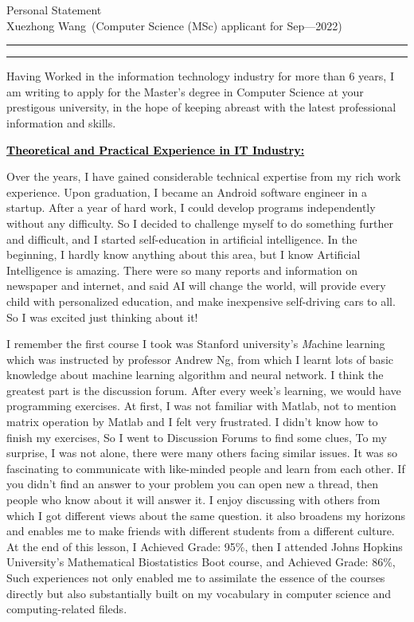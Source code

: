 \documentclass[12pt]{article}
\newcommand{\soptitle}{Personal Statement}
\newcommand{\yourname}{Xuezhong Wang}
\newcommand{\statement}[1]{\par\medskip
  \underline{\textcolor{black}{\textbf{#1:}}}\space
}
\begin{document}
\begin{center}\LARGE\soptitle\\
\large \yourname\ (Computer Science (MSc) applicant for Sep---2022)
\end{center}

\hrule
\vspace{1pt}
\hrule height 1pt


\sffamily
\mdseries



\bigskip

Having Worked in the information technology industry for more than 6 years, I am writing to apply for the Master's degree in Computer Science at your prestigous university, in the hope of keeping abreast with the latest professional information and skills.

\bigskip

\statement{Theoretical and Practical Experience in IT Industry}
Over the years, I have gained considerable technical expertise from my rich work experience. Upon graduation, I became an Android software engineer in a startup. After a year of hard work, I could develop programs independently without any difficulty. So I decided to challenge myself to do something further and difficult, and I started self-education in artificial intelligence. In the beginning, I hardly know anything about this area, but I know Artificial Intelligence is amazing. There were so many reports and information on newspaper and internet, and said AI will change the world, will provide every child with personalized education, and make inexpensive self-driving cars to all. So I was excited just thinking about it! 

\bigskip

I remember the first course I took was Stanford university's \textit{M}achine learning which was instructed by professor Andrew Ng, from which I learnt lots of basic knowledge about machine learning algorithm and neural network. I think the greatest part is the discussion forum. After every week's learning, we would have programming exercises. At first, I was not familiar with Matlab, not to mention matrix operation by Matlab and I felt very frustrated. I didn't know how to finish my exercises, So I went to Discussion Forums to find some clues, To my surprise, I was not alone, there were many others facing similar issues. It was so fascinating to communicate with like-minded people and learn from each other. If you didn't find an answer to your problem you can open new a thread, then people who know about it will answer it. I enjoy discussing with others from which I got different views about the same question. it also broadens my horizons and enables me to make friends with different students from a different culture. At the end of this lesson, I Achieved Grade: 95\%, then I attended Johns Hopkins University's Mathematical Biostatistics Boot course, and Achieved Grade: 86\%, Such experiences not only enabled me to assimilate the essence of the courses directly but also substantially built on my vocabulary in computer science  and computing-related fileds.
\end{document}
